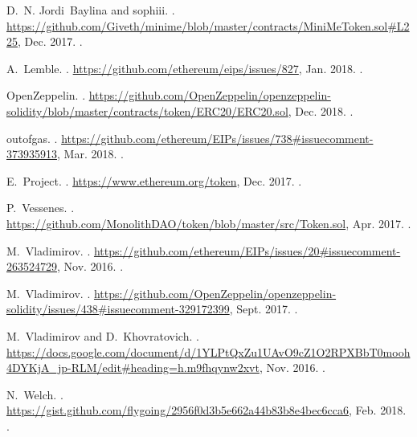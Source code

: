 \begin{thebibliography}{10}
D.~N. Jordi~Baylina and sophiii.
.
\newblock
  \url{https://github.com/Giveth/minime/blob/master/contracts/MiniMeToken.sol\#L225},
  Dec. 2017.
.

A.~Lemble.
.
\newblock \url{https://github.com/ethereum/eips/issues/827}, Jan. 2018.
.

OpenZeppelin.
.
\newblock
  \url{https://github.com/OpenZeppelin/openzeppelin-solidity/blob/master/contracts/token/ERC20/ERC20.sol},
  Dec. 2018.
.

outofgas.
.
\newblock
  \url{https://github.com/ethereum/EIPs/issues/738\#issuecomment-373935913},
  Mar. 2018.
.

E.~Project.
.
\newblock \url{https://www.ethereum.org/token}, Dec. 2017.
.

P.~Vessenes.
.
\newblock \url{https://github.com/MonolithDAO/token/blob/master/src/Token.sol},
  Apr. 2017.
.

M.~Vladimirov.
.
\newblock
  \url{https://github.com/ethereum/EIPs/issues/20\#issuecomment-263524729},
  Nov. 2016.
.

M.~Vladimirov.
.
\newblock
  \url{https://github.com/OpenZeppelin/openzeppelin-solidity/issues/438\#issuecomment-329172399},
  Sept. 2017.
.

M.~Vladimirov and D.~Khovratovich.
.
\newblock
  \url{https://docs.google.com/document/d/1YLPtQxZu1UAvO9cZ1O2RPXBbT0mooh4DYKjA_jp-RLM/edit#heading=h.m9fhqynw2xvt},
  Nov. 2016.
.

N.~Welch.
.
\newblock
  \url{https://gist.github.com/flygoing/2956f0d3b5e662a44b83b8e4bec6cca6}, Feb.
  2018.
.


\end{thebibliography}
